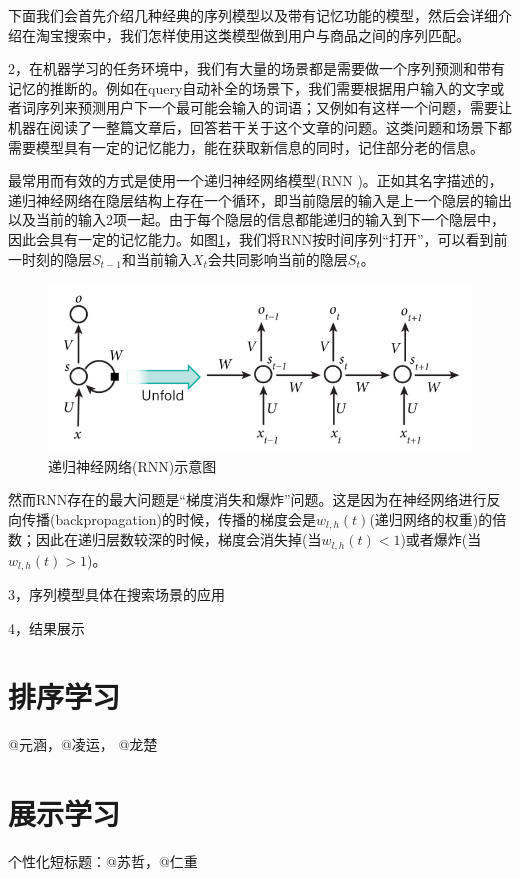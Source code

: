 下面我们会首先介绍几种经典的序列模型以及带有记忆功能的模型，然后会详细介绍在淘宝搜索中，我们怎样使用这类模型做到用户与商品之间的序列匹配。

2，在机器学习的任务环境中，我们有大量的场景都是需要做一个序列预测和带有记忆的推断的。例如在query自动补全的场景下，我们需要根据用户输入的文字或者词序列来预测用户下一个最可能会输入的词语；又例如有这样一个问题，需要让机器在阅读了一整篇文章后，回答若干关于这个文章的问题。这类问题和场景下都需要模型具有一定的记忆能力，能在获取新信息的同时，记住部分老的信息。

最常用而有效的方式是使用一个递归神经网络模型(RNN \cite{4,5})。正如其名字描述的，递归神经网络在隐层结构上存在一个循环，即当前隐层的输入是上一个隐层的输出以及当前的输入2项一起。由于每个隐层的信息都能递归的输入到下一个隐层中，因此会具有一定的记忆能力。如图\ref{fig:RNN}，我们将RNN按时间序列“打开”，可以看到前一时刻的隐层$S_{t-1}$和当前输入$X_t$会共同影响当前的隐层$S_{t}$。

\begin{figure}
	\centering
	\includegraphics[width=0.8\linewidth]{"fig/RNN"}
	\caption{递归神经网络(RNN)示意图}
	\label{fig:RNN}
\end{figure}	

然而RNN存在的最大问题是“梯度消失和爆炸”问题。这是因为在神经网络进行反向传播(backpropagation)的时候，传播的梯度会是$w_{l,h}(t)$(递归网络的权重)的倍数；因此在递归层数较深的时候，梯度会消失掉(当$w_{l,h}(t)<1$)或者爆炸(当$w_{l,h}(t)>1$)。

3，序列模型具体在搜索场景的应用

4，结果展示
	
\section{排序学习}
	@元涵，@凌运， @龙楚
\subsection{}

\section{展示学习}
	个性化短标题：@苏哲，@仁重 

